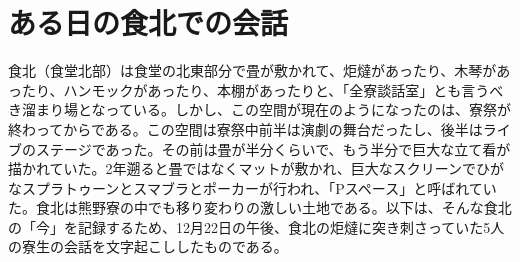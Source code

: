 \section{ある日の食北での会話}\label{sec:shokuhoku}

食北（食堂北部）は食堂の北東部分で畳が敷かれて、炬燵があったり、木琴があったり、ハンモックがあったり、本棚があったりと、「全寮談話室」とも言うべき溜まり場となっている。しかし、この空間が現在のようになったのは、寮祭が終わってからである。この空間は寮祭中前半は演劇の舞台だったし、後半はライブのステージであった。その前は畳が半分くらいで、もう半分で巨大な立て看が描かれていた。2年遡ると畳ではなくマットが敷かれ、巨大なスクリーンでひがなスプラトゥーンとスマブラとポーカーが行われ、「Pスペース」と呼ばれていた。食北は熊野寮の中でも移り変わりの激しい土地である。以下は、そんな食北の「今」を記録するため、12月22日の午後、食北の炬燵に突き刺さっていた5人の寮生の会話を文字起こししたものである。

\tatespace %

